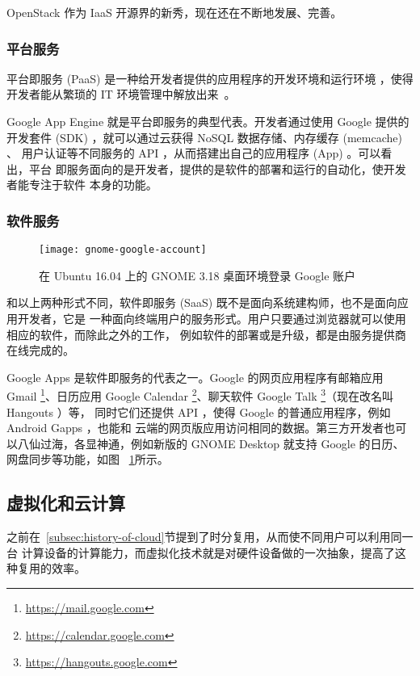 OpenStack 作为 IaaS 开源界的新秀，现在还在不断地发展、完善。

\subsubsection{平台服务}

平台即服务 (PaaS) 是一种给开发者提供的应用程序的开发环境和运行环境
，使得开发者能从繁琐的 IT 环境管理中解放出来~\cite{cloud-and-openstack}。

Google App Engine 就是平台即服务的典型代表。开发者通过使用 Google 提供的
开发套件 (SDK) ，就可以通过云获得 NoSQL 数据存储、内存缓存 (memcache) 、
用户认证等不同服务的 API ，从而搭建出自己的应用程序 (App) 。可以看出，平台
即服务面向的是开发者，提供的是软件的部署和运行的自动化，使开发者能专注于软件
本身的功能。

\subsubsection{软件服务}

\begin{figure}[h]
    \centering
    \texttt{[image: gnome-google-account]}
    \caption{在 Ubuntu 16.04 上的 GNOME 3.18 桌面环境登录 Google 账户}
    \label{fig:gnome-google-account}
\end{figure}

和以上两种形式不同，软件即服务 (SaaS) 既不是面向系统建构师，也不是面向应用开发者，它是
一种面向终端用户的服务形式。用户只要通过浏览器就可以使用相应的软件，而除此之外的工作，
例如软件的部署或是升级，都是由服务提供商在线完成的。

Google Apps 是软件即服务的代表之一。Google 的网页应用程序有邮箱应用 Gmail
 \footnote{\url{https://mail.google.com}}、日历应用 Google Calendar
 \footnote{\url{https://calendar.google.com}}、聊天软件 Google Talk
 \footnote{\url{https://hangouts.google.com}}（现在改名叫 Hangouts ）等，
同时它们还提供 API ，使得 Google 的普通应用程序，例如 Android Gapps ，也能和
云端的网页版应用访问相同的数据。第三方开发者也可以八仙过海，各显神通，例如新版的
 GNOME Desktop 就支持 Google 的日历、网盘同步等功能，如图
 ~\ref{fig:gnome-google-account}所示。

\subsection{虚拟化和云计算}

之前在~\ref{subsec:history-of-cloud}节提到了时分复用，从而使不同用户可以利用同一台
计算设备的计算能力，而虚拟化技术就是对硬件设备做的一次抽象，提高了这种复用的效率。

